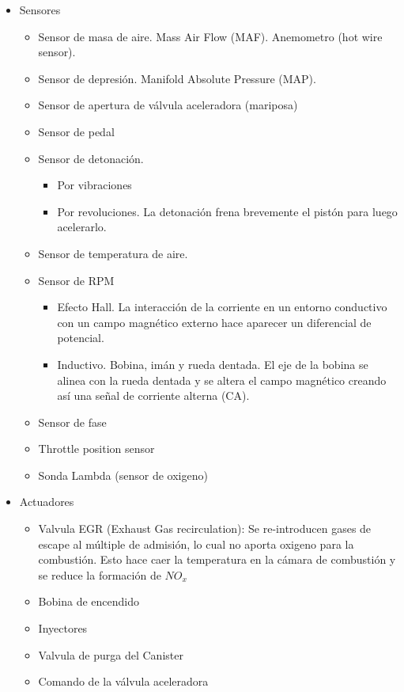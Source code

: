 \begin{itemize}
    \item Sensores
\begin{itemize}
    \item Sensor de masa de aire. Mass Air Flow (MAF). Anemometro (hot wire sensor).
    \item Sensor de depresión. Manifold Absolute Pressure (MAP).
    \item Sensor de apertura de válvula aceleradora (mariposa)
    \item Sensor de pedal
    \item Sensor de detonación.
    \begin{itemize}
        \item Por vibraciones
        \item Por revoluciones. La detonación frena brevemente el pistón para luego acelerarlo.
    \end{itemize}
    \item Sensor de temperatura de aire.
    \item Sensor de RPM
    \begin{itemize}
        \item Efecto Hall. La interacción de la corriente en un entorno conductivo con un campo magnético externo hace aparecer un diferencial de potencial.
        \item Inductivo. Bobina, imán y rueda dentada. El eje de la bobina se alinea con la rueda dentada y se altera el campo magnético creando así una señal de corriente alterna (CA).
    \end{itemize}
    \item Sensor de fase
    \item Throttle position sensor
    \item Sonda Lambda (sensor de oxigeno)
\end{itemize}
    \item Actuadores
    \begin{itemize}
   \item Valvula EGR (Exhaust Gas recirculation): Se re-introducen gases de escape al múltiple de admisión, lo cual no aporta oxigeno para la combustión. Esto hace caer la temperatura en la cámara de combustión y se reduce la formación de $NO_x$
   \item Bobina de encendido
   \item Inyectores
   \item Valvula de purga del Canister
   \item Comando de la válvula aceleradora

\end{itemize}
\end{itemize}
